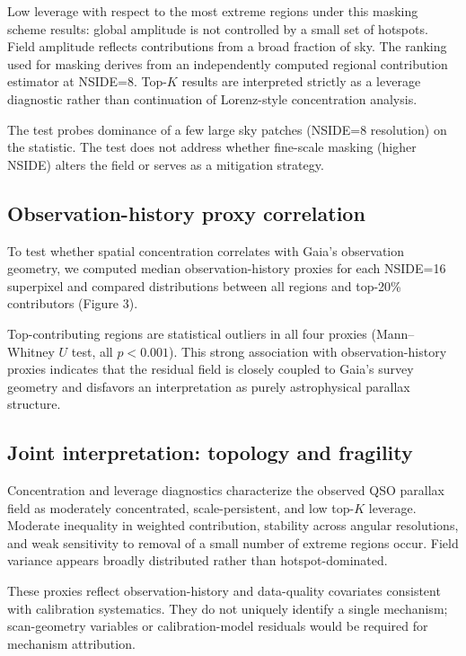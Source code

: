 Low leverage with respect to the most extreme regions under this masking scheme results: global amplitude is not controlled by a small set of hotspots. Field amplitude reflects contributions from a broad fraction of sky. The ranking used for masking derives from an independently computed regional contribution estimator at NSIDE=8. Top-$K$ results are interpreted strictly as a leverage diagnostic rather than continuation of Lorenz-style concentration analysis.

The test probes dominance of a few large sky patches (NSIDE=8 resolution) on the statistic. The test does not address whether fine-scale masking (higher NSIDE) alters the field or serves as a mitigation strategy.

\subsection{Observation-history proxy correlation}

To test whether spatial concentration correlates with Gaia's observation geometry, we computed median observation-history proxies for each NSIDE=16 superpixel and compared distributions between all regions and top-20\% contributors (Figure 3).

Top-contributing regions are statistical outliers in all four proxies (Mann--Whitney $U$ test, all $p < 0.001$). This strong association with observation-history proxies indicates that the residual field is closely coupled to Gaia’s survey geometry and disfavors an interpretation as purely astrophysical parallax structure.

\subsection{Joint interpretation: topology and fragility}
Concentration and leverage diagnostics characterize the observed QSO parallax field as moderately concentrated, scale-persistent, and low top-$K$ leverage. Moderate inequality in weighted contribution, stability across angular resolutions, and weak sensitivity to removal of a small number of extreme regions occur. Field variance appears broadly distributed rather than hotspot-dominated.




These proxies reflect observation-history and data-quality covariates consistent with calibration systematics. They do not uniquely identify a single mechanism; scan-geometry variables or calibration-model residuals would be required for mechanism attribution.
